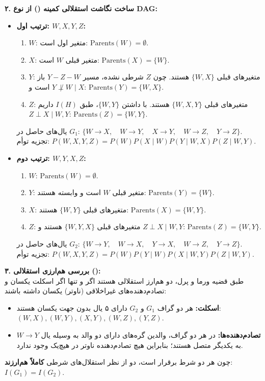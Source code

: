 \textbf{۲. ساخت نگاشت استقلالی کمینه () از نوع DAG:}
\begin{itemize}
  \item \textbf{ترتیب اول: $W, X, Y, Z$:}
  \begin{enumerate}
    \item $W$: متغیر اول است: $\mathrm{Parents}(W) = \emptyset$.
    \item $X$: متغیر قبلی $W$ است: $\mathrm{Parents}(X) = \{W\}$.
    \item $Y$: متغیرهای قبلی $\{W, X\}$ هستند. چون $Z$ شرطی نشده، مسیر $Y-Z-W$ باز است و $Y \not\perp W \mid X$: $\mathrm{Parents}(Y) = \{W, X\}$.
    \item $Z$: متغیرهای قبلی $\{W, X, Y\}$ هستند. با داشتن $\{W, Y\}$، طبق $I(H)$ داریم $Z \perp X \mid W, Y$: $\mathrm{Parents}(Z) = \{W, Y\}$.
  \end{enumerate}
  یال‌های حاصل در $G_1$: $\{ W \to X, \quad W \to Y, \quad X \to Y, \quad W \to Z, \quad Y \to Z \}$. \\
  تجزیه توأم: $P(W, X, Y, Z) = P(W) P(X \mid W) P(Y \mid W, X) P(Z \mid W, Y)$.

  \item \textbf{ترتیب دوم: $W, Y, X, Z$:}
  \begin{enumerate}
    \item $W$: $\mathrm{Parents}(W) = \emptyset$.
    \item $Y$: متغیر قبلی $W$ است و وابسته هستند: $\mathrm{Parents}(Y) = \{W\}$.
    \item $X$: متغیرهای قبلی $\{W, Y\}$ هستند: $\mathrm{Parents}(X) = \{W, Y\}$.
    \item $Z$: متغیرهای قبلی $\{W, Y, X\}$ هستند و $Z \perp X \mid W, Y$: $\mathrm{Parents}(Z) = \{W, Y\}$.
  \end{enumerate}
  یال‌های حاصل در $G_2$: $\{ W \to Y, \quad W \to X, \quad Y \to X, \quad W \to Z, \quad Y \to Z \}$. \\
  تجزیه توأم: $P(W, X, Y, Z) = P(W) P(Y \mid W) P(X \mid W, Y) P(Z \mid W, Y)$.
\end{itemize}

\textbf{۳. بررسی هم‌ارزی استقلالی ():} \\
طبق قضیه ورما و پرل، دو  هم‌ارز استقلالی هستند اگر و تنها اگر اسکلت یکسان و تصادم‌دهنده‌های غیراخلاقی (ناوتر) یکسان داشته باشند:
\begin{itemize}
  \item \textbf{اسکلت:} هر دو گراف $G_1$ و $G_2$ دارای ۵ یال بدون جهت یکسان هستند: $(W, X), (W, Y), (X, Y), (W, Z), (Y, Z)$.
  \item \textbf{تصادم‌دهنده‌ها:} در هر دو گراف، والدین گره‌های دارای دو والد به وسیله یال $W \to Y$ به یکدیگر متصل هستند؛ بنابراین هیچ تصادم‌دهنده ناوتر در هیچ‌یک وجود ندارد.
\end{itemize}
چون هر دو شرط برقرار است، دو  از نظر استقلال‌های شرطی \textbf{کاملاً هم‌ارزند}: $I(G_1) = I(G_2)$.

